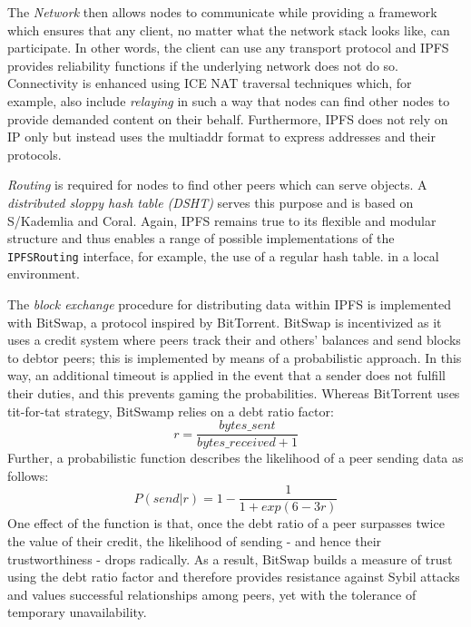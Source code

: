 \documentclass[conference]{IEEEtran}
\begin{document}
The \textit{Network} then allows nodes to communicate while providing a framework which ensures that any client, no matter what the network stack looks like, can participate.
In other words, the client can use any transport protocol and IPFS provides reliability functions if the underlying network does not do so. 
Connectivity is enhanced using ICE NAT traversal techniques \cite{ice-nat} which, for example, also include \textit{relaying} in such a way that nodes can find other nodes to provide demanded content on their behalf.
Furthermore, IPFS does not rely on IP only but instead uses the multiaddr\cite{multiaddr} format to express addresses and their protocols.

\textit{Routing} is required for nodes to find other peers which can serve objects.
A \textit{distributed sloppy hash table (DSHT)}\cite{dsht} serves this purpose and is based on S/Kademlia\cite{kademlia} and Coral\cite{coral}. 
Again, IPFS remains true to its flexible and modular structure and thus enables a range of possible implementations of the \texttt{IPFSRouting} interface, for example, the use of a regular hash table. \cite{ipfs-whitepaper} in a local environment.

The \textit{block exchange} procedure for distributing data within IPFS is implemented with BitSwap\cite{bitswap}, a protocol inspired by BitTorrent\cite{bittorrent}.
BitSwap is incentivized as it uses a credit system where peers track their and others' balances and send blocks to debtor peers; this is implemented by means of a probabilistic approach.
In this way, an additional timeout is applied in the event that a sender does not fulfill their duties, and this prevents gaming the probabilities.
Whereas BitTorrent uses tit-for-tat strategy, BitSwamp relies on a debt ratio factor: \[r=\frac{bytes\_sent}{bytes\_received+1}\]
Further, a probabilistic function describes the likelihood of a peer sending data as follows:
\[P(send|r)= 1-\frac{1}{1 + exp(6-3r)}\]
One effect of the function is that, once the debt ratio of a peer surpasses twice the value of their credit, the likelihood of sending - and hence their trustworthiness - drops radically.
As a result, BitSwap builds a measure of trust using the debt ratio factor and therefore provides resistance against Sybil attacks and values successful relationships among peers, yet with the tolerance of temporary unavailability. \cite{ipfs-whitepaper}
\end{document}
